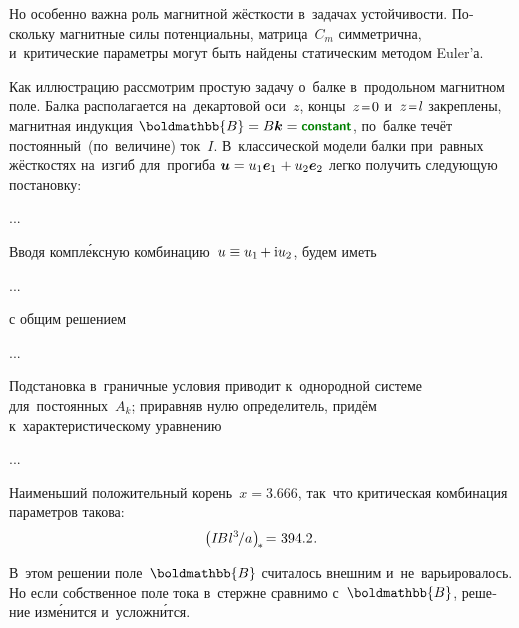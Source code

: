 \begin{otherlanguage}{russian}
Но особенно важна роль магнитной жёсткости в~задачах устойчивости. Поскольку магнитные силы потенциальны, матрица~$C_m$ симметрична, и~критические параметры могут быть найдены статическим методом Euler’а.

Как иллюстрацию рассмотрим простую задачу о~балке в~продольном магнитном поле.
Балка располагается на~декартовой оси~$z$, концы~${z \narroweq 0}$ и~${z \narroweq l}$ закреплены, магнитная индукция ${\boldmathbb{B} = B\bm{k} = \boldconstant}$, по~балке течёт постоянный~(по~величине) ток~$I$.
В~классической модели балки при~равных жёсткостях на~изгиб для~прогиба ${\bm{u} = u_1 \bm{e}_1 \hspace{.16ex} + u_2 \bm{e}_2}$ легко получить следующую постановку:

...

Вводя компл\'{е}ксную комбинацию~${u \equiv u_1 \hspace{-0.16ex} + \mathrm{i} u_2}$, будем иметь

...

\noindent с общим решением

...

\noindent Подстановка в~граничные условия приводит к~однородной системе для~постоянных~${A_k}$; приравняв нулю определитель, придём к~характеристическому уравнению

...


\noindent Наименьший положительный корень~${x = 3.666}$, так~что критическая комбинация параметров такова:
\[
\left( I \hspace{-0.25ex} B \hspace{.1ex} {l^3} \hspace{-0.2ex} / a \hspace{.1ex} \right)_{\hspace{-0.32ex}*} \hspace{-0.32ex} = \hspace{.1ex} 394.2 \hspace{.12ex}.
\]

В~этом решении поле~$\boldmathbb{B}$ считалось внешним и~не~варьировалось. Но если собственное поле тока в~стержне сравнимо с~$\boldmathbb{B}$, решение изм\'{е}нится и~усложн\'{и}тся.

\end{otherlanguage}

\section*{\small \wordforbibliography}

